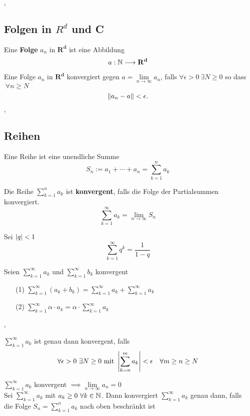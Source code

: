 \sep

\subsection{Folgen in $R^{d}$ und C}

\Def[2.6.1] Eine \textbf{Folge} $a_n$ in $\mathbf{R^{d}}$ ist eine Abbildung
\[
a: \mathbb{N}\longrightarrow \mathbf{R^{d}}
\] 

\Def[2.6.2] Eine Folge $a_n$ in $\mathbf{R^{d}}$ konvergiert gegen ${a = \lim\limits_{n \rightarrow \infty} a_{n}}$, falls $ \forall \epsilon > 0 \ \exists N \geq 0$ so dass $\ \forall n\geq N$
\[
 \left\lVert a_n-a \right\rVert < \epsilon.
\]
\sep

\subsection{Reihen}

\Def[2.7.0] Eine Reihe ist eine unendliche Summe
\[S_{n} := a_{1}  + \cdots + a_{n} = \sum_{k=1}^{n} a_{k}\]

\Def[2.7.1] Die Reihe $\sum_{k=1}^{n} a_{k}$ ist \textbf{konvergent}, falls die Folge der Partialsummen konvergiert. 
\[\sum_{k=1}^{\infty} a_{k} = \lim\limits_{n \rightarrow \infty} S_{n} \]

 Sei $\left\lvert q \right\rvert < 1$
\[\sum_{k=1}^{\infty} q^k = \frac{1}{1-q} \]

\Satz[2.7.4] Seien $\sum_{k=1}^{\infty} a_{k}$ und $\sum_{k=1}^{\infty} b_{k}$ konvergent
\begin{enumerate}
\item[(1)] $\sum_{k=1}^{\infty} (a_{k} + b_{k}) = \sum_{k=1}^{\infty} a_{k} + \sum_{k=1}^{\infty} a_{k}$ 
\item[(2)] $\sum_{k=1}^{\infty} \alpha \cdot a_{k} = \alpha \cdot \sum_{k=1}^{\infty} a_{k}$
\end{enumerate}

\sep

 $\sum_{k=1}^{\infty} a_{k}$ ist genau dann konvergent, falls
\[ \forall \epsilon > 0 \ \exists N \geq 0 \text{ mit } \left\lvert \sum_{k=n}^{m} a_{k} \right\rvert < \epsilon \quad \forall m \geq n \geq N\] 

\Bem $\sum_{k=1}^{\infty} a_{k}$ konvergent $\implies  \lim\limits_{n \rightarrow \infty} a_{n} = 0$ \\

\Satz[2.7.6] Sei $\sum_{k=1}^{\infty} a_{k}$ mit $a_{k} \geq  0 \ \forall k \in \mathbb{N}$. Dann konvergiert
$\sum_{k=1}^{\infty} a_{k}$ genau dann, falls die Folge $S_{n} = \sum_{k=1}^{n} a_{k}$ nach oben beschränkt ist

